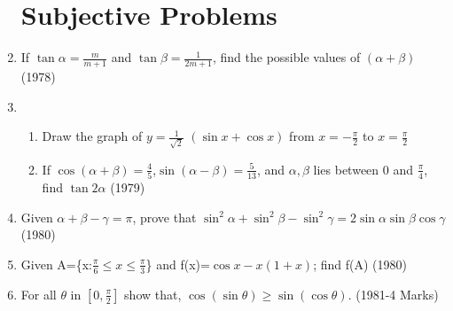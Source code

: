 \documentclass[journal,12pt,twocolumn]{IEEEtran}
\theoremstyle{remark}
\begin{document}
\begin{enumerate}
\section{Subjective Problems}
\item If $\tan\alpha=\frac{m}{m+1}$ and $\tan\beta=\frac{1}{2m+1}$, find the possible values  of $(\alpha+\beta)$ \hfill(1978)
\item 
\begin{enumerate}
    \item Draw the graph of $y=\frac{1}{\sqrt{2}}$ $(\sin x+\cos x)$ from $x=-\frac{\pi}{2}$ to $x=\frac{\pi}{2}$
    \item If $\cos(\alpha+\beta)=\frac{4}{5}$,$\sin(\alpha-\beta)=\frac{5}{13}$, and $\alpha,\beta$ lies between 0 and $\frac{\pi}{4}$, find $\tan2\alpha$ \hfill(1979)
\end{enumerate}
\item Given $\alpha+\beta-\gamma=\pi$, prove that $\sin^2\alpha+\sin^2\beta-\sin^2\gamma=2\sin\alpha\sin\beta\cos\gamma$ \hfill(1980)
\item Given A=\{x:$\frac{\pi}{6} \le x \le\frac{\pi}{3}$\} and f(x)=$\cos x-x(1+x)$; find f(A) \hfill(1980)

\item For all $\theta$ in $\left[0, \frac{\pi}{2}\right]$ show that, $\cos(\sin\theta)\geq
\sin(\cos\theta).$ \hfill(1981-4 Marks)

\end{enumerate}
\end{document}
